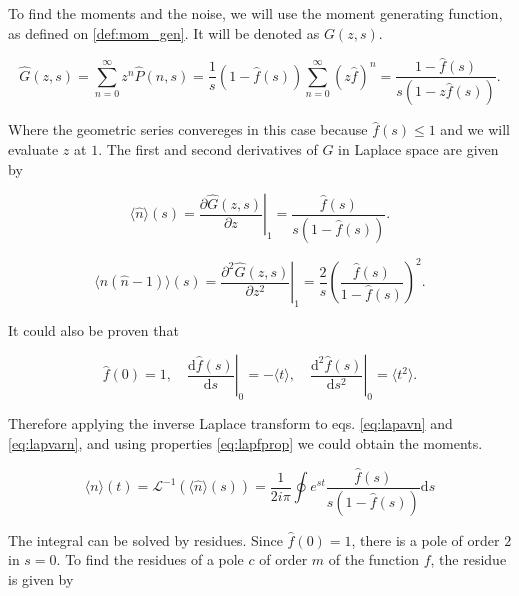 To find the moments and the noise, we will use the moment generating function, as defined on \eqref{def:mom_gen}. It will be denoted as $G(z,s)$.

\begin{equation}
  \label{eq:lapG}
  \hat{G}(z,s) = \sum_{n=0}^{\infty}z^n\hat{P}(n,s) = \frac{1}{s}(1-\hat{f}(s))\sum_{n=0}^{\infty}(z\hat{f})^n=\frac{1-\hat{f}(s)}{s(1-z\hat{f}(s))}.
\end{equation}

Where the geometric series convereges in this case because $\hat{f}(s)\leq1$ and we will evaluate $z$ at $1$. The first and second derivatives of $G$ in Laplace space are given by

\begin{equation}
  \label{eq:lapavn}
  \langle\hat{n}\rangle(s) = \left.\frac{\partial\hat{G}(z,s)}{\partial z}\right|_1 = \frac{\hat{f}(s)}{s(1-\hat{f}(s))}.
\end{equation}

\begin{equation}
  \label{eq:lapvarn}
  \langle\hat{n}(\hat{n}-1)\rangle(s) = \left.\frac{\partial^2\hat{G}(z,s)}{\partial z^2}\right|_1 = \frac{2}{s}\left(\frac{\hat{f}(s)}{1-\hat{f}(s)}\right)^2.
\end{equation}

It could also be proven that


\begin{equation}
  \label{eq:lapfprop}
  \hat{f}(0) = 1, \quad \left.\frac{\mathrm{d}\hat{f}(s)}{\mathrm{d}s}\right|_0=-\langle t\rangle,\quad \left.\frac{\mathrm{d}^2\hat{f}(s)}{\mathrm{d}s^2}\right|_0=\langle t^2\rangle.
\end{equation}

Therefore applying the inverse Laplace transform to eqs. \eqref{eq:lapavn} and \eqref{eq:lapvarn}, and using properties \eqref{eq:lapfprop} we could obtain the moments. 


\begin{equation}
  \langle n\rangle(t) = \mathcal{L}^{-1}(\langle\hat{n}\rangle(s))=\frac{1}{2i\pi}\oint e^{st}\frac{\hat{f}(s)}{s(1-\hat{f}(s))}\mathrm{d}s
\end{equation}

The integral can be solved by residues. Since $\hat{f}(0)=1$, there is a pole of order $2$ in $s=0$. To find the residues of a pole $c$ of order $m$ of the function $f$, the residue is given by

